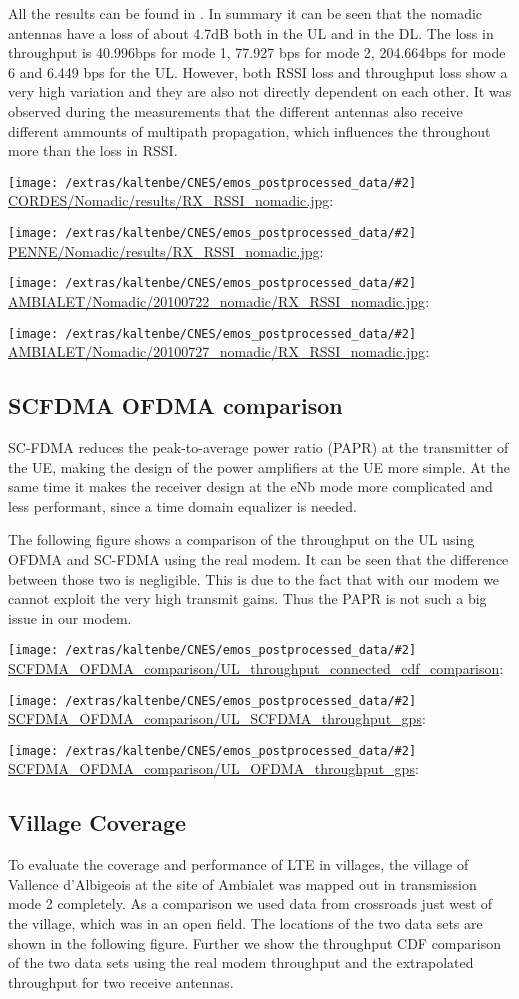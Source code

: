 \documentclass[a4paper,10pt]{article}
\newcommand{\printfile}[2][]{
 \begin{minipage}{8cm}
  \centering
  \texttt{[image: /extras/kaltenbe/CNES/emos\_postprocessed\_data/\#2]}
  \url{#2}: #1

 \end{minipage}
}
\begin{document}
All the results can be found in \cite{nomadic}. In summary it can be seen that the nomadic antennas have a loss of about 4.7dB both in the UL and in the DL. The loss in throughput is 40.996bps for mode 1, 77.927 bps for mode 2, 204.664bps for mode 6 and 6.449 bps for the UL. However, both RSSI loss and throughput loss show a very high variation and they are also not directly dependent on each other. It was observed during the measurements that the different antennas also receive different ammounts of multipath propagation, which influences the throughout more than the loss in RSSI.  

\printfile{CORDES/Nomadic/results/RX_RSSI_nomadic.jpg}
\printfile{PENNE/Nomadic/results/RX_RSSI_nomadic.jpg}

\printfile{AMBIALET/Nomadic/20100722_nomadic/RX_RSSI_nomadic.jpg}
\printfile{AMBIALET/Nomadic/20100727_nomadic/RX_RSSI_nomadic.jpg}

\subsection{SCFDMA OFDMA comparison}

SC-FDMA reduces the peak-to-average power ratio (PAPR) at the transmitter of the UE, making the design of the power amplifiers at the UE more simple. At the same time it makes the receiver design at the eNb mode more complicated and less performant, since a time domain equalizer is needed. 

The following figure shows a comparison of the throughput on the UL using OFDMA and SC-FDMA using the real modem. It can be seen that the difference between those two is negligible. This is due to the fact that with our modem we cannot exploit the very high transmit gains. Thus the PAPR is not such a big issue in our modem. 


\printfile{SCFDMA_OFDMA_comparison/UL_throughput_connected_cdf_comparison}

\printfile{SCFDMA_OFDMA_comparison/UL_SCFDMA_throughput_gps}
\printfile{SCFDMA_OFDMA_comparison/UL_OFDMA_throughput_gps}

\subsection{Village Coverage}

To evaluate the coverage and performance of LTE in villages, the village of Vallence d'Albigeois at the site of Ambialet was mapped out in transmission mode 2 completely. As a comparison we used data from crossroads just west of the village, which was in an open field. The locations of the two data sets are shown in the following figure. Further we show the throughput CDF comparison of the two data sets using the real modem throughput and the extrapolated throughput for two receive antennas. 
\end{document}
